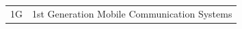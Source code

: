
\begin{terminology}[英文缩略语]
  \setlength\tabcolsep{10pt} %

  \begin{longtable}{ll}
1G    & 1st Generation Mobile Communication Systems \\

  \end{longtable}
\end{terminology}




